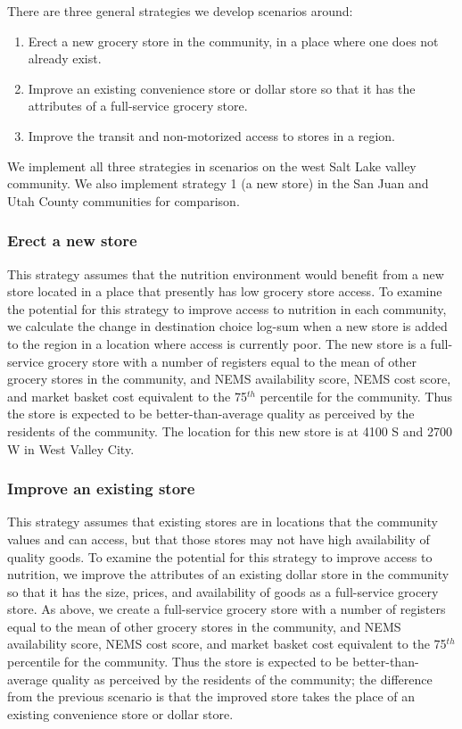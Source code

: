 \documentclass[
  letterpaper,
  number,
  review,
  3p]{elsarticle}
\providecommand{\tightlist}{%
  \setlength{\itemsep}{0pt}\setlength{\parskip}{0pt}}\usepackage{longtable,booktabs,array}
\begin{document}
There are three general strategies we develop scenarios around:

\begin{enumerate}
\def\labelenumi{\arabic{enumi}.}
\tightlist
\item
  Erect a new grocery store in the community, in a place where one does
  not already exist.
\item
  Improve an existing convenience store or dollar store so that it has
  the attributes of a full-service grocery store.
\item
  Improve the transit and non-motorized access to stores in a region.
\end{enumerate}

We implement all three strategies in scenarios on the west Salt Lake
valley community. We also implement strategy 1 (a new store) in the San
Juan and Utah County communities for comparison.

\subsubsection{Erect a new store}\label{erect-a-new-store}

This strategy assumes that the nutrition environment would benefit from
a new store located in a place that presently has low grocery store
access. To examine the potential for this strategy to improve access to
nutrition in each community, we calculate the change in destination
choice log-sum when a new store is added to the region in a location
where access is currently poor. The new store is a full-service grocery
store with a number of registers equal to the mean of other grocery
stores in the community, and NEMS availability score, NEMS cost score,
and market basket cost equivalent to the 75\(^{th}\) percentile for the
community. Thus the store is expected to be better-than-average quality
as perceived by the residents of the community. The location for this
new store is at 4100 S and 2700 W in West Valley City.

\subsubsection{Improve an existing
store}\label{improve-an-existing-store}

This strategy assumes that existing stores are in locations that the
community values and can access, but that those stores may not have high
availability of quality goods. To examine the potential for this
strategy to improve access to nutrition, we improve the attributes of an
existing dollar store in the community so that it has the size, prices,
and availability of goods as a full-service grocery store. As above, we
create a full-service grocery store with a number of registers equal to
the mean of other grocery stores in the community, and NEMS availability
score, NEMS cost score, and market basket cost equivalent to the
75\(^{th}\) percentile for the community. Thus the store is expected to
be better-than-average quality as perceived by the residents of the
community; the difference from the previous scenario is that the
improved store takes the place of an existing convenience store or
dollar store.
\end{document}
